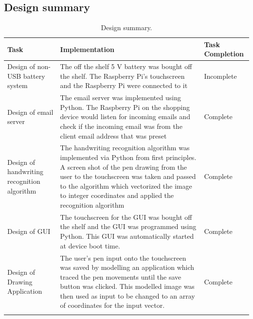 \subsection{Design summary}
\begin{center}
	\begin{longtable}{|p{4cm}|p{7cm}|p{5cm}|}
		\hline 
		\textbf{Task} &
		\textbf{Implementation} &
		\textbf{Task Completion}
		\\
		\hline
		Design of non-USB battery system& The off the shelf 5 V battery was bought off the shelf. The Raspberry Pi's touchscreen and the Raspberry Pi were connected to it & Incomplete\\
		\hline
		Design of email server
		&  The email server was implemented using Python. The Raspberry Pi on the shopping device would listen for incoming emails and check if the incoming email was from the client email address that was preset &  Complete\\
		\hline
		Design of handwriting recognition algorithm
		 &  The handwriting recognition algorithm was implemented via Python from first principles. A screen shot of the pen drawing from the user to the touchscreen was taken and passed to the algorithm which vectorized the image to integer coordinates and applied the recognition algorithm& Complete\\
		 \hline
		 Design of GUI
		 &  The touchscreen for the GUI was bought off the shelf and the GUI was programmed using Python. This GUI was automatically started at device boot time.& Complete\\
		 \hline
		 Design of Drawing Application
		&  The user's pen input onto the touchscreen was saved by modelling an application which traced the pen movements until the save button was clicked. This modelled image was then used as input to be changed to an array of coordinates for the input vector.& Complete\\		 
		
		\hline
		\caption{Design summary.}
	\end{longtable}
\end{center}

\newpage


